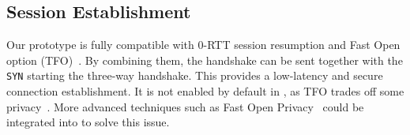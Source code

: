 \subsection{\tcpls Session Establishment}

Our prototype is fully compatible with  0-RTT session resumption
and \tcp Fast Open option (TFO)~\cite{radhakrishnan2011tcp}. By combining them,
the \tcpls handshake can be sent together with the \tcp \texttt{SYN} starting 
the three-way handshake. This provides a low-latency and secure connection establishment.
It is not enabled by default in \tcpls, as TFO trades off some privacy~\cite{sy2020enhanced}.
More advanced techniques such as \tcp Fast Open Privacy~\cite{sy2020enhanced} 
could be
integrated into \tcpls to solve this issue.





